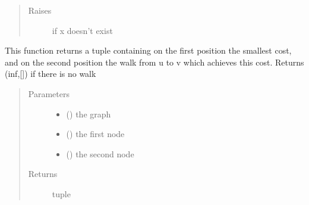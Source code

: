 \documentclass[letterpaper,10pt,english]{sphinxmanual}
\begin{document}
\begin{fulllineitems}
\begin{fulllineitems}
\begin{quote}
\begin{description}
\item[{Raises}] \leavevmode
{} \textendash{} if x doesn’t exist

\end{description}\end{quote}

\end{fulllineitems}


\end{fulllineitems}


\begin{fulllineitems}
\label{\detokenize{Graph:Graph.floyd_warshall}}
This function returns a tuple containing on the first position the smallest cost, and on the second position the walk from u to v which achieves this cost. Returns (inf,{[}{]}) if there is no walk
\begin{quote}\begin{description}
\item[{Parameters}] \leavevmode\begin{itemize}
\item {} 
 ({\hyperref[\detokenize{Graph:Graph.Graph}]{}}) \textendash{} the graph

\item {} 
 () \textendash{} the first node

\item {} 
 () \textendash{} the second node

\end{itemize}

\item[{Returns}] \leavevmode
tuple

\end{description}\end{quote}

\end{fulllineitems}

\end{document}
